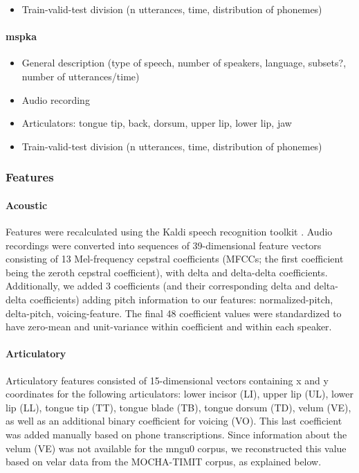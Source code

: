 \begin{itemize}
\item Train-valid-test division (n utterances, time, distribution of phonemes)
\end{itemize}

{\color{gray}
\paragraph{mspka}
\begin{itemize}
\item General description (type of speech, number of speakers, language, subsets?, number of utterances/time)
\item Audio recording
\item Articulators: tongue {tip, back, dorsum}, upper lip, lower lip, jaw
\item Train-valid-test division (n utterances, time, distribution of phonemes)
\end{itemize}}

\subsubsection{Features} 
\paragraph{Acoustic}
Features were recalculated using the Kaldi speech recognition toolkit \cite{povey2011}. Audio recordings were converted into sequences of 39-dimensional feature vectors consisting of 13 Mel-frequency cepstral coefficients (MFCCs; the first coefficient being the zeroth cepstral coefficient), with delta and delta-delta coefficients. 
Additionally, we added 3 coefficients (and their corresponding delta and delta-delta coefficients) adding pitch information to our features: normalized-pitch, delta-pitch, voicing-feature. 
The final 48 coefficient values were standardized to have zero-mean and unit-variance within coefficient and within each speaker.

\paragraph{Articulatory}
Articulatory features consisted of 15-dimensional vectors containing x and y coordinates for the following articulators: lower incisor (LI), upper lip (UL), lower lip (LL), tongue tip (TT), tongue blade (TB), tongue dorsum (TD), velum (VE), as well as an additional binary coefficient for voicing (VO). %
This last coefficient was added manually based on phone transcriptions.
Since information about the velum (VE) was not available for the mngu0 corpus, we reconstructed this value based on velar data from the MOCHA-TIMIT corpus, as explained below.  

